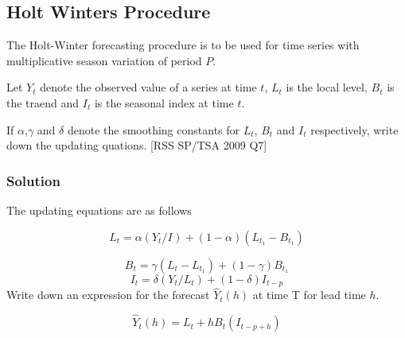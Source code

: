 \subsection*{Holt Winters Procedure}

The Holt-Winter forecasting procedure is to be used for time series with multiplicative season variation of period $P$.

Let $Y_t$ denote the observed value of a series at time $t$, $L_t$ is the local level, $B_t$ is the traend and $I_t$ is the seasonal index at time $t$.

If $\alpha$,$\gamma$ and $\delta$ denote the smoothing constants for $L_t$, $B_t$ and $I_t$ respectively, write down the updating quations.
[RSS SP/TSA 2009 Q7]

\subsubsection*{Solution}
The updating equations are as follows

\[ L_t = \alpha(Y_t/I_{}) +(1-\alpha)(L_{t_1} - B_{t_1} )\]

\[ B_t = \gamma(L_{t} - L_{t_1} ) + (1-\gamma)B_{t_1} \]
\[ I_t = \delta (Y_t/L_t) + (1-\delta)I_{t-p}\]
Write down an expression for the forecast $\hat{Y}_t(h)$ at time T for lead time $h$.

\[  \hat{Y}_t(h) = L_t + hB_t (I_{t-p+h}) \]

